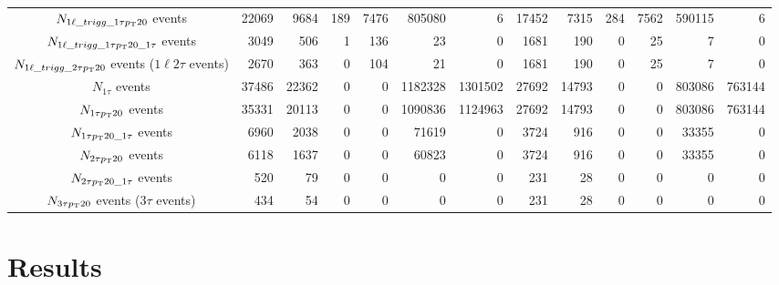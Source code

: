 \documentclass[letterpaper,12pt]{article}
\begin{document}
\begin{table}
{\begin{tabular}{c|rrrrrr|rrrrrr}
      $N_{1\ell\_trigg\_1\tau p_{\mathrm{T}}20}$ events & 22069 & 9684 & 189 & 7476 & 805080 & 6 & 17452 & 7315 & 284 & 7562 & 590115 & 6\\
      $N_{1\ell\_trigg\_1\tau p_{\mathrm{T}}20\_1\tau}$ events & 3049 & 506 & 1 & 136 & 23 & 0 & 1681 & 190 & 0 & 25 & 7 & 0\\
      \rowcolor{highlight}$N_{1\ell\_trigg\_2\tau p_{\mathrm{T}}20}$ events ($1\ell2\tau$ events) & 2670 & 363 & 0 & 104 & 21 & 0 & 1681 & 190 & 0 & 25 & 7 & 0\\
      $N_{1\tau}$ events & 37486 & 22362 & 0 & 0 & 1182328 & 1301502 & 27692 & 14793 & 0 & 0 & 803086 & 763144\\
      $N_{1\tau p_{\mathrm{T}}20}$ events & 35331 & 20113 & 0 & 0 & 1090836 & 1124963 & 27692 & 14793 & 0 & 0 & 803086 & 763144\\
      $N_{1\tau p_{\mathrm{T}}20\_1\tau}$ events & 6960 & 2038 & 0 & 0 & 71619 & 0 & 3724 & 916 & 0 & 0 & 33355 & 0\\
      $N_{2\tau p_{\mathrm{T}}20}$ events & 6118 & 1637 & 0 & 0 & 60823 & 0 & 3724 & 916 & 0 & 0 & 33355 & 0\\
      $N_{2\tau p_{\mathrm{T}}20\_1\tau}$ events & 520 & 79 & 0 & 0 & 0 & 0 & 231 & 28 & 0 & 0 & 0 & 0\\
      \rowcolor{highlight} $N_{3\tau p_{\mathrm{T}}20}$ events ($3\tau$ events) & 434 & 54 & 0 & 0 & 0 & 0 & 231 & 28 & 0 & 0 & 0 & 0\\
      \hline
      \hline	
    \end{tabular}%
  }
  \caption{}
  \label{tab:cutflow}
\end{table}

\section{Results}
\label{sec:results}
\end{document}
